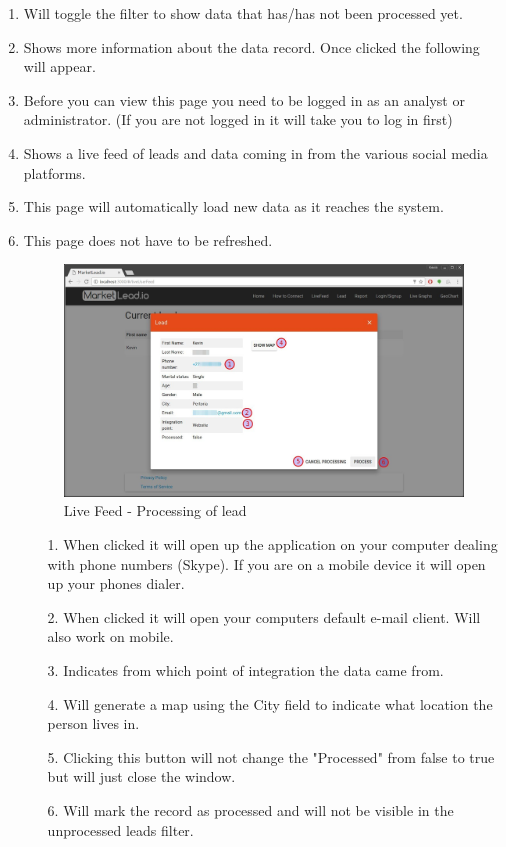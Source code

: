 \documentclass{article}
\begin{document}
			\begin{enumerate}
				\item Will toggle the filter to show data that has/has not been processed yet.
				\item Shows more information about the data record. Once clicked the following will appear.
				\item Before you can view this page you need to be logged in as an analyst or administrator. (If you are not logged in it will take you to log in first)
				\item Shows a live feed of leads and data coming in from the various social media platforms.
				\item This page will automatically load new data as it reaches the system.
				\item This page does not have to be refreshed.
					\begin{figure}[H]
						\includegraphics[width=\textwidth]{images/live_feed_process.jpg}
						\caption{Live Feed - Processing of lead}
						\label{fig:liveFeedProcessing}
					\end{figure}

					\begin{itemize}
						\item[1.] When clicked it will open up the application on your computer dealing with phone numbers (Skype). If you are on a mobile device it will open up your phones dialer.
						\item[2.] When clicked it will open your computers default e-mail client. Will also work on mobile.
						\item[3.] Indicates from which point of integration the data came from.
						\item[4.] Will generate a map using the City field to indicate what location the person lives in.
						\item[5.] Clicking this button will not change the "Processed" from false to true but will just close the window.
						\item[6.] Will mark the record as processed and will not be visible in the unprocessed leads filter.
					\end{itemize}
			\end{enumerate}
\end{document}
